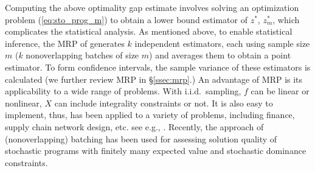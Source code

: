 \documentclass[12pt]{article}
\newcommand{\X}{X}
\newcommand{\x}{x}
\newcommand{\xh}{{\hat{\x}}}
\newcommand{\zs}{z^*}
\begin{document}
Computing the above optimality gap estimate involves solving an optimization problem (\ref{eq:sto_prog_m}) to obtain a lower bound estimator of $\zs$, $\zs_m$, which complicates the statistical analysis. 
As mentioned above, to enable statistical inference, the MRP of \citet{Mak1999} generates $k$ independent estimators, each using sample size $m$ ($k$ nonoverlapping batches of size $m$) and averages them to obtain a point estimator.  
To form confidence intervals, the sample variance of these estimators is calculated (we further review MRP in \S \ref{ssec:mrp}.)  
An advantage of MRP is its applicability to a wide range of problems.  
With i.i.d.\ sampling, $f$ can be linear or nonlinear, $\X$ can include integrality constraints or not.  
It is also easy to implement, thus, has been applied to a variety of problems, including finance, supply chain network design, etc.\; see e.g., \citep{bertocchi_etal_99,janjarassuk_linderoth_08,santoso_ahmed_etal_05}.  
Recently, the approach of (nonoverlapping) batching has been used for assessing solution quality of stochastic programs with finitely many expected value \citep{wang_ahmed_08} and stochastic dominance \citep{hu2010sample} constraints.

\end{document}
